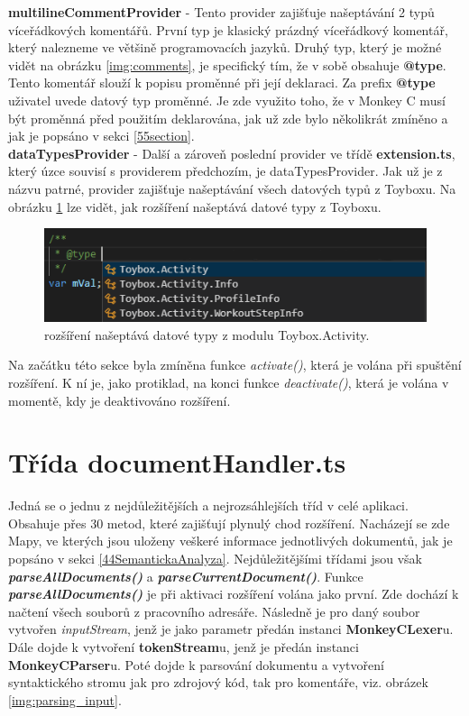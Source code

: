 \textbf{multilineCommentProvider} - Tento provider zajišťuje našeptávání 2 typů víceřádkových komentářů. První typ je klasický prázdný víceřádkový komentář, který nalezneme ve většině programovacích jazyků. Druhý typ, který je možné vidět na obrázku \ref{img:comments}, je specifický tím, že v sobě obsahuje \textbf{@type}. Tento komentář slouží k popisu proměnné při její deklaraci. Za prefix  \textbf{@type} uživatel uvede datový typ proměnné. Je zde využito toho, že v Monkey C musí být proměnná před použitím deklarována, jak už zde bylo několikrát zmíněno a jak je popsáno v sekci \ref{55section}.\\

\textbf{dataTypesProvider} - Další a zároveň poslední provider ve třídě \textbf{extension.ts}, který úzce souvisí s providerem předchozím, je dataTypesProvider. Jak už je z názvu patrné, provider zajišťuje našeptávání všech datových typů z Toyboxu. Na obrázku \ref{img:data_types} lze vidět, jak rozšíření našeptává datové typy z Toyboxu.\\

\begin{figure}[h!]
	\centering
	\includegraphics[width=\textwidth,scale=1]{images/data_types}
	\caption{rozšíření našeptává datové typy z modulu Toybox.Activity.}
	\label{img:data_types}
\end{figure}

Na začátku této sekce byla zmíněna funkce \textit{activate()}, která je volána při spuštění rozšíření. K ní je, jako protiklad, na konci funkce \textit{deactivate()}, která je volána v momentě, kdy je deaktivováno rozšíření.\\

\section{Třída documentHandler.ts}
Jedná se o jednu z nejdůležitějších a nejrozsáhlejších tříd v celé aplikaci. Obsahuje přes 30 metod, které zajišťují plynulý chod rozšíření. Nacházejí se zde Mapy, ve kterých jsou uloženy veškeré informace jednotlivých dokumentů, jak je popsáno v sekci \ref{44SemantickaAnalyza}. Nejdůležitějšími třídami jsou však \textit{\textbf{parseAllDocuments()}} a \textit{\textbf{parseCurrentDocument()}}. Funkce \textit{\textbf{parseAllDocuments()}} je při aktivaci rozšíření volána jako první. Zde dochází k načtení všech souborů z pracovního adresáře. Následně je pro daný soubor vytvořen \textit{inputStream}, jenž je jako parametr předán instanci \textbf{MonkeyCLexer}u. Dále dojde k vytvoření \textbf{tokenStream}u, jenž je předán instanci \textbf{MonkeyCParser}u. Poté dojde k parsování dokumentu a vytvoření syntaktického stromu jak pro zdrojový kód, tak pro komentáře, viz. obrázek \ref{img:parsing_input}.\\


